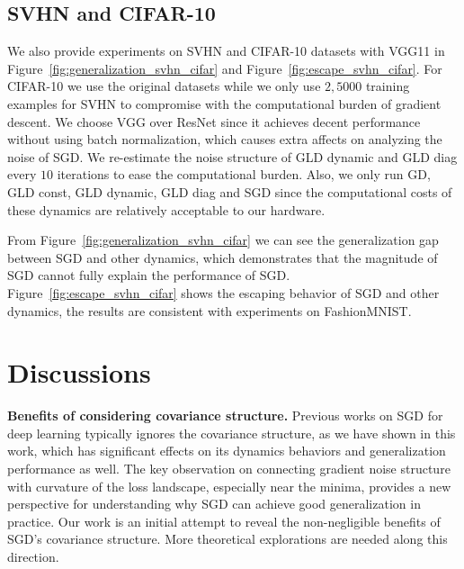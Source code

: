 \documentclass{article}
\begin{document}
\subsection{SVHN and CIFAR-10}
We also provide experiments on SVHN and CIFAR-10 datasets with VGG11 in Figure~\ref{fig:generalization_svhn_cifar} and Figure~\ref{fig:escape_svhn_cifar}.
For CIFAR-10 we use the original datasets while we only use $2,5000$ training examples for SVHN to compromise with the computational burden of gradient descent.
We choose VGG over ResNet since it achieves decent performance without using batch normalization, which causes extra affects on analyzing the noise of SGD.
We re-estimate the noise structure of GLD dynamic and GLD diag every $10$ iterations to ease the computational burden.
Also, we only run GD, GLD const, GLD dynamic, GLD diag and SGD since the computational costs of these dynamics are relatively acceptable to our hardware.

From Figure~\ref{fig:generalization_svhn_cifar} we can see the generalization gap between SGD and other dynamics, which demonstrates that the magnitude of SGD cannot fully explain the performance of SGD.
Figure~\ref{fig:escape_svhn_cifar} shows the escaping behavior of SGD and other dynamics, the results are consistent with experiments on FashionMNIST.

\section{Discussions}
\label{sec:dis}

\textbf{Benefits of considering covariance structure.} Previous works on SGD for deep learning typically ignores the covariance structure, as we have shown in this work, which has significant effects on its dynamics behaviors and generalization performance as well. 
The key observation on connecting gradient noise structure with curvature of the loss landscape, especially near the minima, provides a new perspective for understanding why SGD can achieve good generalization in practice.
Our work is an initial attempt to reveal the non-negligible benefits of SGD's covariance structure. More theoretical explorations are needed along this direction.
\end{document}
